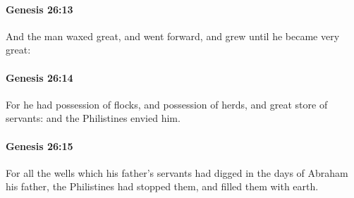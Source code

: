 		\paragraph{Genesis 26:13} %
			\label{GENESIS-26-13}

			And the man waxed great, and went forward, and grew until he became very great:


		\paragraph{Genesis 26:14} %
			\label{GENESIS-26-14}

			For he had possession of flocks, and possession of herds, and great store of servants: and the Philistines envied him.


		\paragraph{Genesis 26:15} %
			\label{GENESIS-26-15}

			For all the wells which his father's servants had digged in the days of Abraham his father, the Philistines had stopped them, and filled them with earth.


